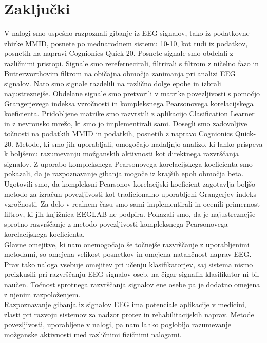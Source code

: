 \chapter{Zaključki}
V nalogi smo uspešno razpoznali gibanje iz EEG signalov, tako iz podatkovne zbirke MMID, posnete po mednarodnem sistemu 10-10, kot tudi iz podatkov, posnetih na napravi Cognionics Quick-20. Posnete signale smo obdelali z različnimi pristopi. Signale smo rerefernecirali, filtrirali s filtrom z ničelno fazo in Butterworthovim filtrom na običajna območja zanimanja pri analizi EEG signalov. Nato smo signale razdelili na različno dolge epohe in izbrali najustreznejše. Obdelane signale smo pretvorili v matrike povezljivosti s pomočjo Grangerjevega indeksa vzročnosti in kompleksnega Pearsonovega korelacijskega koeficienta. Pridobljene matrike smo razvrstili z aplikacijo Clasification Learner in z nevronsko mrežo, ki smo jo implementirali sami. Dosegli smo zadovoljive točnosti na podatkih MMID in podatkih, posnetih z napravo Cognionics Quick-20. Metode, ki smo jih uporabljali, omogočajo nadaljnjo analizo, ki lahko prispeva k boljšemu razumevanju možganskih aktivnosti kot direktnega razvrščanja signalov. Z uporabo kompleksnega Pearsonovega korelacijskega koeficienta smo pokazali, da je razpoznavanje gibanja mogoče iz krajših epoh območja beta. Ugotovili smo, da kompleksni Pearsonov korelacijski koeficient zagotavlja boljšo metodo za izračun povezljivosti kot tradicionalno uporabljeni Grangerjev indeks vzročnosti. Za delo v realnem času smo sami implementirali in ocenili primernost filtrov, ki jih knjižnica EEGLAB ne podpira. Pokazali smo, da je najustreznejše sprotno razvrščanje z metodo povezljivosti kompleksnega Pearsonovega korelacijskega koeficienta.\\
Glavne omejitve, ki nam onemogočajo še točnejše razvrščanje z uporabljenimi metodami,  so omejena velikost posnetkov in omejena natančnost naprav EEG. Prav tako naloga vsebuje omejitev pri učenju klasifikatorjev, saj sistema nismo preizkusili pri razvrščanju EEG signalov oseb, na čigar signalih klasifikator ni bil naučen. Točnost sprotnega razvrščanja signalov ene osebe pa je dodatno omejena z njenim razpoloženjem.\\
Razpoznavanje gibanja iz signalov EEG ima potenciale aplikacije v medicini, zlasti pri razvoju sistemov za nadzor protez in rehabilitacijskih naprav. Metode povezljivosti, uporabljene v nalogi, pa nam lahko poglobijo razumevanje možganske aktivnosti med različnimi fizičnimi nalogami.


